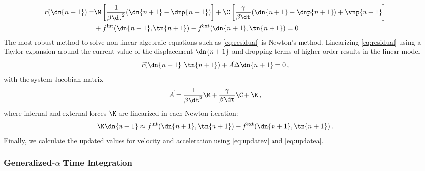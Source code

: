 \begin{align}
     \vec r(\dn{n+1}) =& \M \left[ \frac{1}{\beta \dt^2} (\dn{n+1} - \dnp{n+1}) \right]
        + \C \left[ \frac{\gamma}{\beta \dt} (\dn{n+1} - \dnp{n+1}) + \vnp{n+1} \right] \nonumber \\
        &+ \vec f^\mathrm{int}(\dn{n+1}, \tn{n+1}) - \vec f^\mathrm{ext}(\dn{n+1}, \tn{n+1}) = 0 \label{eq:residual}
\end{align}
The most robust method to solve non-linear algebraic equations such as \autoref{eq:residual} is Newton's method.
Linearizing \autoref{eq:residual} using a Taylor expansion around the current value of the displacement $\dn{n+1}$ and dropping terms of higher order results in the linear model
\begin{equation}
    \vec r(\dn{n+1}, \tn{n+1}) + \vec A \Delta \dn{n+1} = 0 \,, \label{eq:linMech}
\end{equation}
with the system Jacobian matrix
\begin{equation}
    \vec A = \frac{1}{\beta \dt^2} \M + \frac{\gamma}{\beta \dt} \C + \K \,,
\end{equation}
where internal and external forces $\K$ are linearized in each Newton iteration:
\begin{equation}
    \K \dn{n+1} \approx \vec f^\mathrm{int}(\dn{n+1}, \tn{n+1}) - \vec f^\mathrm{ext}(\dn{n+1}, \tn{n+1}) \,.
\end{equation}
Finally, we calculate the updated values for velocity and acceleration using \autoref{eq:updatev} and \autoref{eq:updatea}.

\subsubsection{Generalized-\texorpdfstring{$\alpha$}{alpha} Time Integration}
\label{model:generalizedAlpha}

